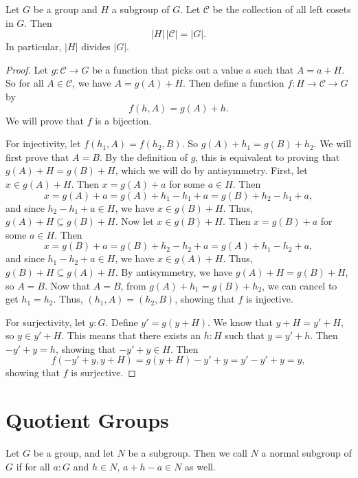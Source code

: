 \documentclass[../../math.tex]{subfiles}
\begin{document}
\begin{theorem}
    Let $G$ be a group and $H$ a subgroup of $G$.  Let $\mathcal C$ be the
    collection of all left cosets in $G$.  Then
    \[
        |H|\, |\mathcal C| = |G|.
    \]
    In particular, $|H|$ divides $|G|$.
\end{theorem}
\begin{proof}
    Let $g : \mathcal C \to G$ be a function that picks out a value $a$ such
    that $A = a + H$.  So for all $A \in \mathcal C$, we have $A = g(A) + H$.
    Then define a function $f : H \to \mathcal C \to G$ by
    \[
        f(h, A) = g(A) + h.
    \]
    We will prove that $f$ is a bijection.

    For injectivity, let $f(h_1, A) = f(h_2, B)$.  So $g(A) + h_1 = g(B) + h_2$.
    We will first prove that $A = B$.  By the definition of $g$, this is
    equivalent to proving that $g(A) + H = g(B) + H$, which we will do by
    antisymmetry.  First, let $x \in g(A) + H$.  Then $x = g(A) + a$ for some $a
    \in H$.  Then
    \[
        x
        = g(A) + a
        = g(A) + h_1 - h_1 + a
        = g(B) + h_2 - h_1 + a,
    \]
    and since $h_2 - h_1 + a \in H$, we have $x \in g(B) + H$.  Thus, $g(A) + H
    \subseteq g(B) + H$.  Now let $x \in g(B) + H$.  Then $x = g(B) + a$ for
    some $a \in H$.  Then
    \[
        x
        = g(B) + a
        = g(B) + h_2 - h_2 + a
        = g(A) + h_1 - h_2 + a,
    \]
    and since $h_1 - h_2 + a \in H$, we have $x \in g(A) + H$.  Thus, $g(B) + H
    \subseteq g(A) + H$.  By antisymmetry, we have $g(A) + H = g(B) + H$, so $A
    = B$.  Now that $A = B$, from $g(A) + h_1 = g(B) + h_2$, we can cancel to
    get $h_1 = h_2$.  Thus, $(h_1, A) = (h_2, B)$, showing that $f$ is
    injective.

    For surjectivity, let $y : G$.  Define $y' = g(y + H)$.  We know that $y + H
    = y' + H$, so $y \in y' + H$.  This means that there exists an $h : H$ such
    that $y = y' + h$.  Then $-y' + y = h$, showing that $-y' + y \in H$.  Then
    \[
        f(-y' + y, y + H) = g(y + H) - y' + y = y' - y' + y = y,
    \]
    showing that $f$ is surjective.
\end{proof}

\section{Quotient Groups}

\begin{definition}
    Let $G$ be a group, and let $N$ be a subgroup.  Then we call $N$ a normal
    subgroup of $G$ if for all $a : G$ and $h \in N$, $a + h - a \in N$ as well.
\end{definition}
\end{document}

